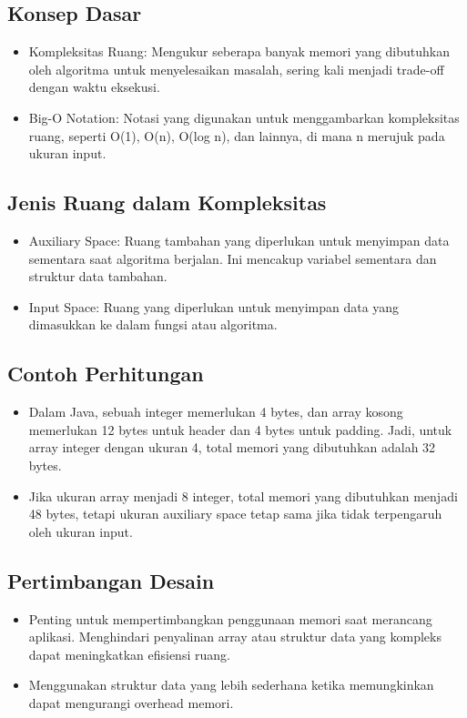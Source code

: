 \documentclass{article}
\begin{document}
\subsection{Konsep Dasar}
\begin{itemize}
    \item Kompleksitas Ruang: Mengukur seberapa banyak memori yang dibutuhkan oleh algoritma untuk menyelesaikan masalah, sering kali menjadi trade-off dengan waktu eksekusi.
    \item Big-O Notation: Notasi yang digunakan untuk menggambarkan kompleksitas ruang, seperti O(1), O(n), O(log n), dan lainnya, di mana n merujuk pada ukuran input.
\end{itemize}

\subsection{Jenis Ruang dalam Kompleksitas}
\begin{itemize}
    \item Auxiliary Space: Ruang tambahan yang diperlukan untuk menyimpan data sementara saat algoritma berjalan. Ini mencakup variabel sementara dan struktur data tambahan.
    \item Input Space: Ruang yang diperlukan untuk menyimpan data yang dimasukkan ke dalam fungsi atau algoritma.
\end{itemize}

\subsection{Contoh Perhitungan}
\begin{itemize}
    \item Dalam Java, sebuah integer memerlukan 4 bytes, dan array kosong memerlukan 12 bytes untuk header dan 4 bytes untuk padding. Jadi, untuk array integer dengan ukuran 4, total memori yang dibutuhkan adalah 32 bytes.
    \item Jika ukuran array menjadi 8 integer, total memori yang dibutuhkan menjadi 48 bytes, tetapi ukuran auxiliary space tetap sama jika tidak terpengaruh oleh ukuran input.
\end{itemize}

\subsection{Pertimbangan Desain}
\begin{itemize}
    \item Penting untuk mempertimbangkan penggunaan memori saat merancang aplikasi. Menghindari penyalinan array atau struktur data yang kompleks dapat meningkatkan efisiensi ruang.
    \item Menggunakan struktur data yang lebih sederhana ketika memungkinkan dapat mengurangi overhead memori.
\end{itemize}
\end{document}
